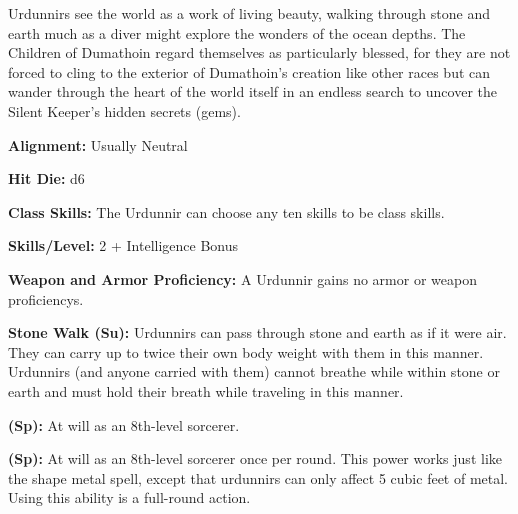 
Urdunnirs see the world as a work of living beauty, walking through stone and earth much as a diver might explore the wonders of the ocean depths. The Children of Dumathoin regard themselves as particularly blessed, for they are not forced to cling to the exterior of Dumathoin’s creation like other races but can wander through the heart of the world itself in an endless search to uncover the Silent Keeper’s hidden secrets (gems).

\textbf{Alignment:} Usually Neutral

\textbf{Hit Die:} d6

\textbf{Class Skills:} The Urdunnir can choose any ten skills to be class skills.

\textbf{Skills/Level:} 2 + Intelligence Bonus

\poorbab{}
\poorfor{}
\poorref{}
\goodwil{}

\begin{classtable}
\end{classtable}

\classfeatures

\textbf{Weapon and Armor Proficiency:} A Urdunnir gains no armor or weapon proficiencys.

\textbf{Stone Walk (Su):} Urdunnirs can pass through stone and earth as if it were air. They can carry up to twice their own body weight with them in this manner. Urdunnirs (and anyone carried with them) cannot breathe while within stone or earth and must hold their breath while traveling in this manner.

\textbf{ (Sp):} At will as an 8th-level sorcerer.

\textbf{ (Sp):} At will as an 8th-level sorcerer once per round. This power works just like the shape metal spell, except that urdunnirs can only affect 5 cubic feet of metal. Using this ability is a full-round action.